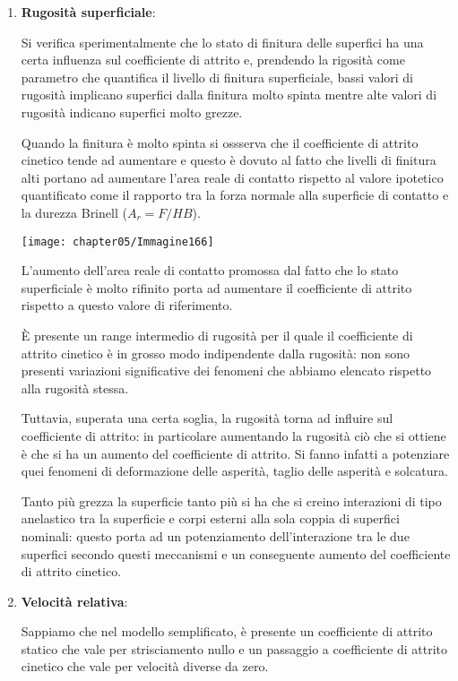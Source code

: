 \begin{enumerate}
\item \textbf{Rugosità superficiale}:

Si verifica sperimentalmente che lo stato di finitura delle superfici ha una certa influenza sul coefficiente di attrito e, prendendo la rigosità come parametro che quantifica il livello di finitura superficiale, bassi valori di rugosità implicano superfici dalla finitura molto spinta mentre alte valori di rugosità indicano superfici molto grezze.

Quando la finitura è molto spinta si ossserva che il coefficiente di attrito cinetico tende ad aumentare e questo è dovuto al fatto che livelli di finitura alti portano ad aumentare l'area reale di contatto rispetto al valore ipotetico quantificato come il rapporto tra la forza normale alla superficie di contatto e la durezza Brinell ($A_r = F/HB$).

\begin{center}
\texttt{[image: chapter05/Immagine166]}
\end{center}

L'aumento dell'area reale di contatto promossa dal fatto che lo stato superficiale è molto rifinito porta ad aumentare il coefficiente di attrito rispetto a questo valore di riferimento.

È presente un range intermedio di rugosità per il quale il coefficiente di attrito cinetico è in grosso modo indipendente dalla rugosità: non sono presenti variazioni significative dei fenomeni che abbiamo elencato rispetto alla rugosità stessa.

Tuttavia, superata una certa soglia, la rugosità torna ad influire sul coefficiente di attrito: in particolare aumentando la rugosità ciò che si ottiene è che si ha un aumento del coefficiente di attrito. Si fanno infatti a potenziare quei fenomeni di deformazione delle asperità, taglio delle asperità e solcatura.

Tanto più grezza la superficie tanto più si ha che si creino interazioni di tipo anelastico tra la superficie e corpi esterni alla sola coppia di superfici nominali: questo porta ad un potenziamento dell'interazione tra le due superfici secondo questi meccanismi e un conseguente aumento del coefficiente di attrito cinetico.
\item \textbf{Velocità relativa}:

Sappiamo che nel modello semplificato, è presente un  coefficiente di attrito statico che vale per strisciamento nullo e un passaggio a coefficiente di attrito cinetico che vale per velocità diverse da zero.


\end{enumerate}
